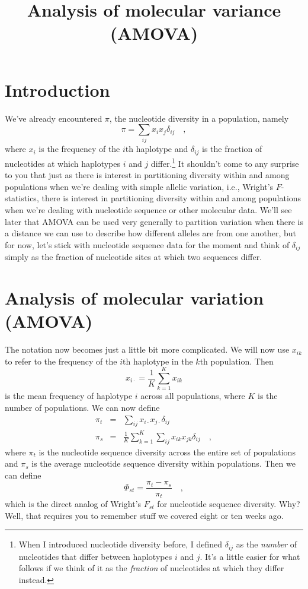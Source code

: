 \documentclass[12pt]{article}
\title{Analysis of molecular variance (AMOVA)}
\begin{document}
\maketitle

\thispagestyle{first}

\section*{Introduction}

We've already encountered $\pi$, the nucleotide diversity in a
population, namely
\[
\pi = \sum_{ij} x_ix_j \delta_{ij} \quad ,
\]
where $x_i$ is the frequency of the $i$th haplotype and $\delta_{ij}$
is the fraction of nucleotides at which haplotypes $i$ and $j$
differ.\footnote{When I introduced nucleotide diversity before, I
  defined $\delta_{ij}$ as the {\it number\/} of nucleotides that
  differ between haplotypes $i$ and $j$. It's a little easier for what
  follows if we think of it as the {\it fraction\/} of nucleotides at
  which they differ instead.} It shouldn't come to any surprise to you
that just as there is interest in partitioning diversity within and
among populations when we're dealing with simple allelic variation,
i.e., Wright's $F$-statistics, there is interest in partitioning
diversity within and among populations when we're dealing with
nucleotide sequence or other molecular data. We'll see later that
AMOVA can be used very generally to partition variation when there is
a distance we can use to describe how different alleles are from one
another, but for now, let's stick with nucleotide sequence data for
the moment and think of $\delta_{ij}$ simply as the fraction of
nucleotide sites at which two sequences differ.

\section*{Analysis of molecular variation (AMOVA)}

The notation now becomes just a little bit more complicated. We will
now use $x_{ik}$ to refer to the frequency of the $i$th haplotype in
the $k$th population. Then
\[
x_{i\cdot} = \frac{1}{K}\sum_{k=1}^K x_{ik}
\]
is the mean frequency of haplotype $i$ across all populations, where
$K$ is the number of populations. We can now define
\begin{eqnarray*}
\pi_t &=& \sum_{ij} x_{i\cdot}x_{j\cdot} \delta_{ij} \\
\pi_s &=& \frac{1}{K}\sum_{k=1}^K\sum_{ij} x_{ik}x_{jk}\delta_{ij} \quad ,
\end{eqnarray*}
where $\pi_t$ is the nucleotide sequence diversity across the entire
set of populations and $\pi_s$ is the average nucleotide sequence
diversity within populations. Then we can define
\begin{equation}
\Phi_{st} = \frac{\pi_t - \pi_s}{\pi_t} \quad ,
\label{eq:phi-st}
\end{equation}
which is the direct analog of Wright's $F_{st}$ for nucleotide
sequence diversity. Why? Well, that requires you to remember stuff we
covered eight or ten weeks ago.
\end{document}
